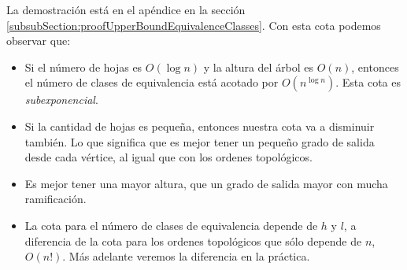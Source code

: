La demostración está en el apéndice en la sección \ref{subsubSection:proofUpperBoundEquivalenceClasses}. Con esta cota podemos observar que: 
\begin{itemize}
    \item Si el número de hojas es $O(\log n)$ y la altura del árbol es $O(n)$, entonces el número de clases de equivalencia está acotado por $O(n^{\log n})$. Esta cota es \emph{subexponencial}. %
    \item Si la cantidad de hojas es pequeña, entonces nuestra cota va a disminuir también. Lo que significa que es mejor tener un pequeño grado de salida desde cada vértice, al igual que con los ordenes topológicos. %
    \item Es mejor tener una mayor altura, que un grado de salida mayor con mucha ramificación.
    \item La cota para el número de clases de equivalencia depende de $h$ y $l$, a diferencia de la cota para los ordenes topológicos que sólo depende de $n$, $O(n!)$. Más adelante veremos la diferencia en la práctica.
\end{itemize}
